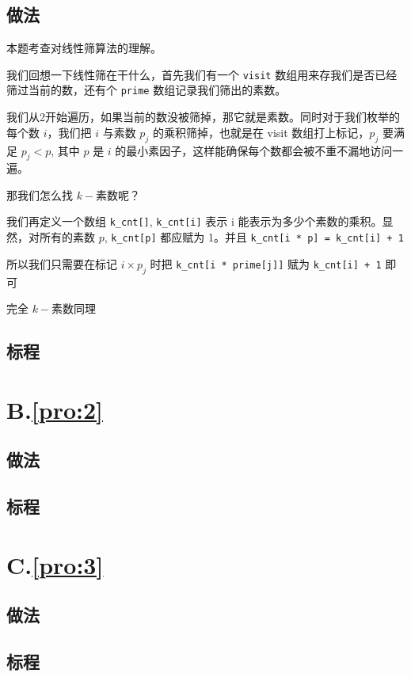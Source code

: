 \documentclass[
	lang=cn,
	color=blue
]{elegantbook}
\begin{document}
\section*{做法}

本题考查对线性筛算法的理解。

我们回想一下线性筛在干什么，首先我们有一个 \verb|visit| 数组用来存我们是否已经筛过当前的数，还有个 \verb|prime| 数组记录我们筛出的素数。

我们从2开始遍历，如果当前的数没被筛掉，那它就是素数。同时对于我们枚举的每个数 $i$，我们把 $i$ 与素数 $p_j$ 的乘积筛掉，也就是在 visit 数组打上标记，$p_j$ 要满足 $p_j<p$, 其中 $p$ 是 $i$ 的最小素因子，这样能确保每个数都会被不重不漏地访问一遍。

那我们怎么找 $k-$素数呢？

我们再定义一个数组 \verb|k_cnt[]|, \verb|k_cnt[i]| 表示 i 能表示为多少个素数的乘积。显然，对所有的素数 $p$, \verb|k_cnt[p]| 都应赋为 1。并且 \verb|k_cnt[i * p] = k_cnt[i] + 1|

所以我们只需要在标记 $i\times p_j$ 时把 \verb|k_cnt[i * prime[j]]| 赋为 \verb|k_cnt[i] + 1| 即可

完全 $k-$素数同理

\section*{标程}

\chapter*{B.\quad \ref*{pro:2}}
\section*{做法}

\section*{标程}

\chapter*{C.\quad \ref*{pro:3}}
\section*{做法}

\section*{标程}
\end{document}
